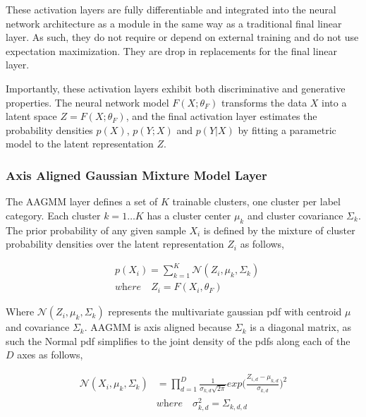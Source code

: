 \documentclass[10pt,twocolumn,letterpaper]{article}
\begin{document}
These activation layers are fully differentiable and integrated into the neural network architecture as a module in the same way as a traditional final linear layer. 
As such, they do not require or depend on external training and do not use expectation maximization.
They are drop in replacements for the final linear layer.

Importantly, these activation layers exhibit both discriminative and generative properties. 
The neural network model $F(X;\theta_F)$ transforms the data $X$ into a latent space $Z = F(X;\theta_F)$, and the final activation layer estimates the probability densities $p(X)$, $p(Y;X)$ and $p(Y|X)$ by fitting a parametric model to the latent representation $Z$.

\subsubsection{Axis Aligned Gaussian Mixture Model Layer}

The AAGMM layer defines a set of $K$ trainable clusters, one cluster per label category. 
Each cluster $k=1 \dots K$ has a cluster center $\mu_k$ and cluster covariance $\Sigma_k$. 
The prior probability of any given sample $X_i$ is defined by the mixture of cluster probability densities over the latent representation $Z_i$ as follows,

\begin{equation}
	\begin{aligned}
		\label{eq_px}
		&p(X_i) = \sum_{k=1}^K \mathcal{N} (Z_i, \mu_{k}, \Sigma_k)
		\\[10pt]
		&\textit{where} \quad Z_i = F(X_i, \theta_F)
	\end{aligned}
\end{equation}

Where $\mathcal{N}(Z_i, \mu_k, \Sigma_k)$ represents the multivariate gaussian pdf with centroid $\mu$ and covariance $\Sigma_k$. 
AAGMM is axis aligned because $\Sigma_k$ is a diagonal matrix, as such the Normal pdf simplifies to the joint density of the pdfs along each of the $D$ axes as follows,

\begin{equation}
	\begin{aligned}
		\mathcal{N} (X_i, \mu_{k}, \Sigma_k) &=  \prod_{d=1}^D \frac{1}{\sigma_{k,d}\sqrt{2 \pi}} exp \Big( \frac{Z_{i,d} - \mu_{k,d}} {\sigma_{k,d}} \Big)^2 \\[10pt]
		&\textit{where} \quad \sigma^2_{k,d} = \Sigma_{k,d,d}
	\end{aligned}
\end{equation}
\end{document}
